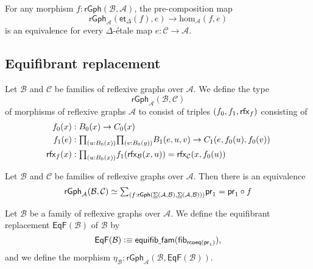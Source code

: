 \begin{thm}
For any morphism $f:\mathsf{rGph}(\mathcal{B},\mathcal{A})$, the pre-composition map
\begin{equation*}
\mathsf{rGph}_{\mathcal{A}}(\mathsf{et}_\Delta(f),e)\to \mathrm{hom}_{\mathcal{A}}(f,e)
\end{equation*}
is an equivalence for every $\Delta$-\'etale map $e:\mathcal{C}\to\mathcal{A}$.
\end{thm}

\subsection{Equifibrant replacement}\label{sec:equifibrant_replacement}

\begin{defn}
Let $\mathcal{B}$ and $\mathcal{C}$ be families of reflexive graphs over $\mathcal{A}$. We define the type
\begin{equation*}
\mathsf{rGph}_{\mathcal{A}}(\mathcal{B},\mathcal{C})
\end{equation*}
of morphisms of reflexive graphs  $\mathcal{A}$ to consist of triples $(\pts{f},\edg{f},\rfx{f})$ consisting of
\begin{align*}
\pts{f}(x) & : \pts{B}(x)\to \pts{C}(x) \\
\edg{f}(e) & : \prd{u:\pts{B}(x)}{v:\pts{B}(y)} \edg{B}(e,u,v)\to \edg{C}(e,\pts{f}(u),\pts{f}(v)) \\
\rfx{f}(x) & : \prd{u:\pts{B}(x)} \edg{f}(\rfx{\mathcal{B}}(x,u))=\rfx{\mathcal{C}}(x,\pts{f}(u))
\end{align*}
\end{defn}

\begin{lem}
Let $\mathcal{B}$ and $\mathcal{C}$ be families of reflexive graphs over $\mathcal{A}$. Then there is an equivalence
\begin{equation*}
\eqv{\mathsf{rGph}_{\mathcal{A}}(\mathcal{B},\mathcal{C})}{\sm{f:\mathsf{rGph}(\msm{\mathcal{A}}{\mathcal{B}},\msm{\mathcal{A}}{\mathcal{B}})} \proj 1 = \proj 1 \circ f}
\end{equation*}
\end{lem}

\begin{defn}
Let $\mathcal{B}$ be a family of reflexive graphs over $\mathcal{A}$. We define the equifibrant replacement $\mathsf{EqF}(\mathcal{B})$ of $\mathcal{B}$ by
\begin{equation*}
\mathsf{EqF}(\mathcal{B}) \vcentcolon\equiv \mathsf{equifib\underline{\ }{}fam}(\mathsf{fib}_{\mathsf{rcoeq}(\mathsf{pr}_{1})}),
\end{equation*}
and we define the morphism $\eta_{\mathcal{B}}:\mathsf{rGph}_{\mathcal{A}}(\mathcal{B},\mathsf{EqF}(\mathcal{B}))$. 
\end{defn}

